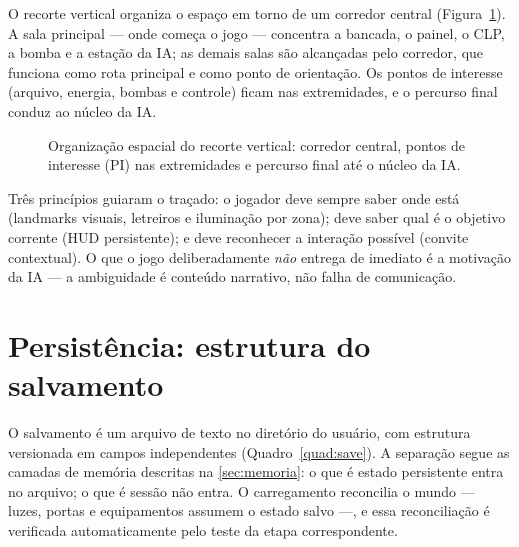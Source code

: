 O recorte vertical organiza o espaço em torno de um corredor central
(Figura~\ref{fig:mapa}). A sala principal --- onde começa o jogo --- concentra
a bancada, o painel, o CLP, a bomba e a estação da IA; as demais salas são
alcançadas pelo corredor, que funciona como rota principal e como ponto de
orientação. Os pontos de interesse (arquivo, energia, bombas e controle)
ficam nas extremidades, e o percurso final conduz ao núcleo da IA.

\begin{figure}[htbp]
\centering
{}
\caption{Organização espacial do recorte vertical: corredor central, pontos de interesse (PI) nas extremidades e percurso final até o núcleo da IA.}
\label{fig:mapa}
\par\vspace{2pt}{\footnotesize Fonte: elaborado pelo autor (2026), a partir do level design do projeto.}
\end{figure}

Três princípios guiaram o traçado: o jogador deve sempre saber onde está
(landmarks visuais, letreiros e iluminação por zona); deve saber qual é o
objetivo corrente (HUD persistente); e deve reconhecer a interação possível
(convite contextual). O que o jogo deliberadamente \emph{não} entrega de
imediato é a motivação da IA --- a ambiguidade é conteúdo narrativo, não
falha de comunicação.

\section{Persistência: estrutura do salvamento}
\label{sec:persistencia}

O salvamento é um arquivo de texto no diretório do usuário, com estrutura
versionada em campos independentes (Quadro~\ref{quad:save}). A separação
segue as camadas de memória descritas na \autoref{sec:memoria}: o que é
estado persistente entra no arquivo; o que é sessão não entra. O carregamento
reconcilia o mundo --- luzes, portas e equipamentos assumem o estado salvo
---, e essa reconciliação é verificada automaticamente pelo teste da etapa
correspondente.

